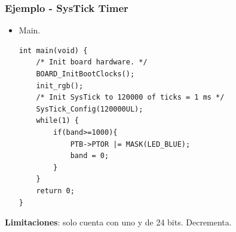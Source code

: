 \documentclass[10.5pt,scale=1.0,t,aspectratio=169,hyperref={pdfpagelabels=false}]{beamer}
\begin{document}
\begin{frame}[fragile]
	\frametitle{Ejemplo - SysTick Timer }
	{\small
		\begin{itemize}
			\item Main.
			\begin{lstlisting}[style=CStyle]
int main(void) {
	/* Init board hardware. */
	BOARD_InitBootClocks();
	init_rgb();
	/* Init SysTick to 120000 of ticks = 1 ms */
	SysTick_Config(120000UL);
	while(1) {
		if(band>=1000){
			PTB->PTOR |= MASK(LED_BLUE);
			band = 0;
		}
	}
	return 0;
}
			\end{lstlisting}
		\end{itemize}
	}

\textbf{Limitaciones}: solo cuenta con uno y de 24 bits. Decrementa. 
\end{frame}
\end{document}
